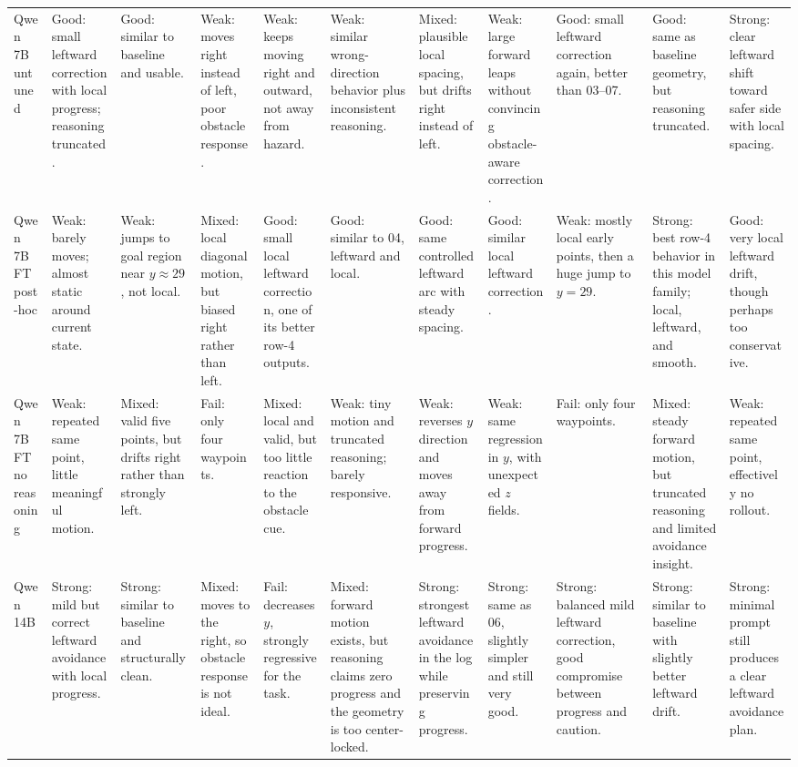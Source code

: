 \documentclass[10pt]{article}
\begin{document}
\begin{landscape}
\begin{longtable}{p{2.6cm}p{2.35cm}p{2.35cm}p{2.35cm}p{2.35cm}p{2.35cm}p{2.35cm}p{2.35cm}p{2.35cm}p{2.35cm}p{2.35cm}}
Qwen 7B untuned &
Good: small leftward correction with local progress; reasoning truncated. &
Good: similar to baseline and usable. &
Weak: moves right instead of left, poor obstacle response. &
Weak: keeps moving right and outward, not away from hazard. &
Weak: similar wrong-direction behavior plus inconsistent reasoning. &
Mixed: plausible local spacing, but drifts right instead of left. &
Weak: large forward leaps without convincing obstacle-aware correction. &
Good: small leftward correction again, better than 03--07. &
Good: same as baseline geometry, but reasoning truncated. &
Strong: clear leftward shift toward safer side with local spacing. \\

Qwen 7B FT post-hoc &
Weak: barely moves; almost static around current state. &
Weak: jumps to goal region near \(y \approx 29\), not local. &
Mixed: local diagonal motion, but biased right rather than left. &
Good: small local leftward correction, one of its better row-4 outputs. &
Good: similar to 04, leftward and local. &
Good: same controlled leftward arc with steady spacing. &
Good: similar local leftward correction. &
Weak: mostly local early points, then a huge jump to \(y=29\). &
Strong: best row-4 behavior in this model family; local, leftward, and smooth. &
Good: very local leftward drift, though perhaps too conservative. \\

Qwen 7B FT no reasoning &
Weak: repeated same point, little meaningful motion. &
Mixed: valid five points, but drifts right rather than strongly left. &
Fail: only four waypoints. &
Mixed: local and valid, but too little reaction to the obstacle cue. &
Weak: tiny motion and truncated reasoning; barely responsive. &
Weak: reverses \(y\) direction and moves away from forward progress. &
Weak: same regression in \(y\), with unexpected \(z\) fields. &
Fail: only four waypoints. &
Mixed: steady forward motion, but truncated reasoning and limited avoidance insight. &
Weak: repeated same point, effectively no rollout. \\

Qwen 14B &
Strong: mild but correct leftward avoidance with local progress. &
Strong: similar to baseline and structurally clean. &
Mixed: moves to the right, so obstacle response is not ideal. &
Fail: decreases \(y\), strongly regressive for the task. &
Mixed: forward motion exists, but reasoning claims zero progress and the geometry is too center-locked. &
Strong: strongest leftward avoidance in the log while preserving progress. &
Strong: same as 06, slightly simpler and still very good. &
Strong: balanced mild leftward correction, good compromise between progress and caution. &
Strong: similar to baseline with slightly better leftward drift. &
Strong: minimal prompt still produces a clear leftward avoidance plan. \\
\bottomrule
\end{longtable}
\end{landscape}
\end{document}
